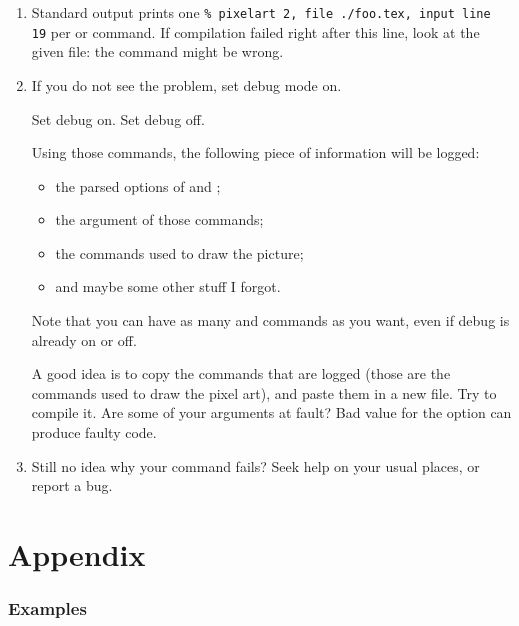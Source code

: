 \documentclass[
  load-preamble-,
  babel-options=english,
  add-index=true,
]{cnltx-doc}
\begin{document}
\begin{enumerate}
  \item Standard output prints one \texttt{\% pixelart 2, file ./foo.tex, input line 19} per  or  command. If compilation failed right after this line, look at the given file: the  command might be wrong.
  \item If you do not see the problem, set debug mode on.

    \begin{multicols}{2}
      \begin{commands}
         Set debug on.
         Set debug off.
      \end{commands}
    \end{multicols}

    Using those commands, the following piece of information will be logged:

    \begin{itemize}
      \item the parsed options of  and ;
      \item the  argument of those commands;
      \item the  commands used to draw the picture;
      \item and maybe some other stuff I forgot.
    \end{itemize}

    Note that you can have as many  and  commands as you want, even if debug is already on or off.

    A good idea is to copy the  commands that are logged (those are the commands used to draw the pixel art), and paste them in a new file. Try to compile it. Are some of your arguments at fault? Bad value for the  option can produce faulty  code.
  \item Still no idea why your  command fails? Seek help on your usual places, or report a bug.
\end{enumerate}

\appendix
\part{Appendix}

\section{Examples}
\label{sec:examples}
\end{document}
